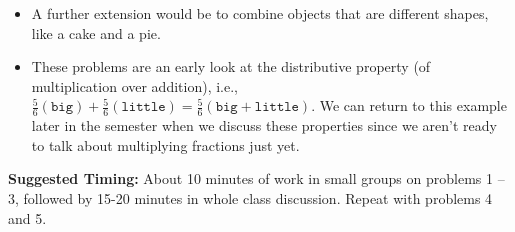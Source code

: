 \documentclass[nooutcomes,noauthor,handout]{ximera}
\begin{document}
\begin{instructorNotes}
\begin{itemize}
	\item A further extension would be to combine objects that are different shapes, like a cake and a pie.
	\item These problems are an early look at the distributive property (of multiplication over addition), i.e., $\frac56(\texttt{big}) + \frac56(\texttt{little}) = \frac56(\texttt{big} + \texttt{little})$.  We can return to this example later in the semester when we discuss these properties since we aren't ready to talk about multiplying fractions just yet.
	
 
\end{itemize}

{\bf Suggested Timing:} 
About 10 minutes of work in small groups on problems 1 -- 3, followed by 15-20 minutes in whole class discussion. Repeat with problems 4 and 5.
\end{instructorNotes}
\end{document}
